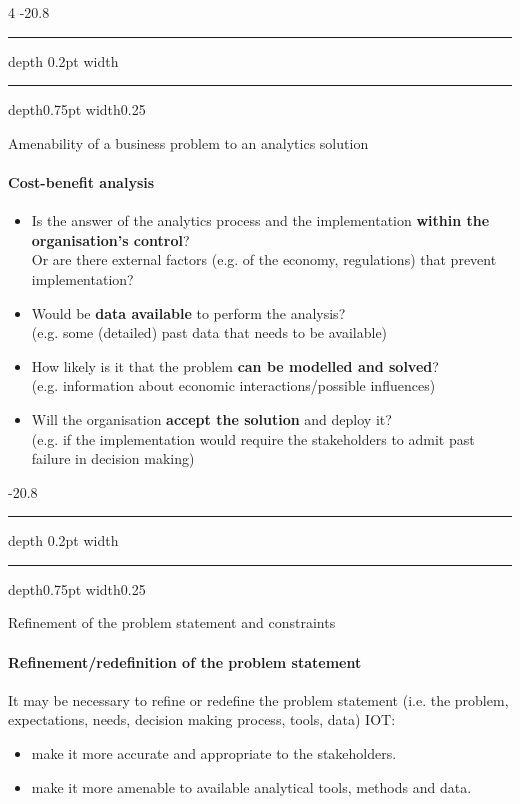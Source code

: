 \documentclass[a4paper, landscape, 6pt, fleqn]{scrartcl}
\makeatletter
\renewcommand{\emph}[1]{\textbf{#1}}
\renewcommand{\subsection}{\@startsection{subsection}{1}{0mm}%
{-2\baselineskip}{0.8\baselineskip}%
{\hrule depth 0.2pt width\columnwidth\hrule depth0.75pt
width0.25\columnwidth\vspace*{1.2em}\large\bfseries}}
\makeatother
\begin{document}
\begin{multicols*}{4}
\subsection{Amenability of a business problem to an analytics solution}

\paragraph{Cost-benefit analysis}

\begin{itemize}
\item Is the answer of the analytics process and the implementation \emph{within the organisation's control}? \\
Or are there external factors (e.g. of the economy, regulations) that prevent implementation?
\item Would be \emph{data available} to perform the analysis? \\
(e.g. some (detailed) past data that needs to be available)
\item How likely is it that the problem \emph{can be modelled and solved}? \\
(e.g. information about economic interactions/possible influences)
\item Will the organisation \emph{accept the solution} and deploy it? \\
(e.g. if the implementation would require the stakeholders to admit past failure in decision making)
\end{itemize}

\subsection{Refinement of the problem statement and constraints}

\paragraph{Refinement/redefinition of the problem statement}

It may be necessary to refine or redefine the problem statement (i.e. the problem, expectations, needs, decision making process, tools, data) IOT:
\begin{itemize}
\item make it more accurate and appropriate to the stakeholders.
\item make it more amenable to available analytical tools, methods and data.
\end{itemize}


\end{multicols*}
\end{document}
